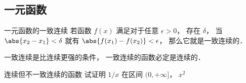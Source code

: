 

\subsection{一元函数}
\begin{definition}{一元函数的一致连续}
若函数 $f(x)$ 满足对于任意 $\epsilon > 0$， 存在 $\delta$， 当 $\abs{x_2 - x_1} < \delta$ 就有 $\abs{f(x_1) - f(x_2)} < \epsilon$， 那么它就是一致连续的．
\end{definition}

一致连续是比连续更强的条件， 一致连续的函数必定是连续的．

\begin{exercise}{连续但不一致连续的函数}
试证明 $1/x$ 在区间 $(0, +\infty]$， $x^2$ 
\end{exercise}
